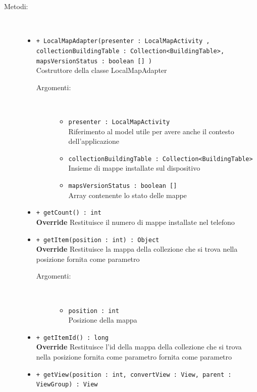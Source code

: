 \documentclass[../DefinizioneDiProdotto.tex]{subfiles}
\begin{document}
\begin{description}
\begin{itemize}
	\end{itemize}
	\item[Metodi:] \
	\begin{itemize}
		\item \texttt{+ LocalMapAdapter(presenter : LocalMapActivity , collectionBuildingTable : Collection<BuildingTable>, mapsVersionStatus : boolean [] )}\\
		Costruttore della classe LocalMapAdapter
		\begin{description}
			\item[Argomenti:] \
			\begin{itemize}
				\item \texttt{presenter : LocalMapActivity }\\
				Riferimento al model utile per avere anche il contesto dell'applicazione\item \texttt{collectionBuildingTable : Collection<BuildingTable>}\\
				Insieme di mappe installate sul dispositivo\item \texttt{mapsVersionStatus : boolean [] }\\
				Array contenente lo stato delle mappe\end{itemize}
		\end{description}
		\item \texttt{+ getCount() : int}\\
		\textbf{Override} Restituisce il numero di mappe installate nel telefono
		\item \texttt{+ getItem(position : int) : Object}\\
		\textbf{Override} Restituisce la mappa della collezione che si trova nella posizione fornita come parametro
		\begin{description}
			\item[Argomenti:] \
			\begin{itemize}
				\item \texttt{position : int}\\
				Posizione della mappa\end{itemize}
		\end{description}
		\item \texttt{+ getItemId() : long}\\
		\textbf{Override} Restituisce l'id della mappa della collezione che si trova nella posizione fornita come parametro fornita come parametro
		\item \texttt{+ getView(position : int, convertView : View, parent : ViewGroup) : View}\\

\end{itemize}
\end{description}
\end{document}
